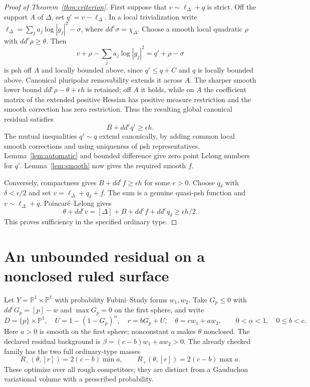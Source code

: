 \documentclass[11pt]{article}
\theoremstyle{remark}
\newcommand{\ddc}{dd^{\mathrm c}}
\newcommand{\PP}{\mathbb P}
\begin{document}
\begin{proof}[Proof of Theorem~\ref{thm:criterion}]
First suppose that $v\sim\ell_\Delta+q$ is strict. Off the support
$A$ of $\Delta$, set $q'=v-\ell_\Delta$. In a local trivialization write
$\ell_\Delta=\sum_j a_j\log|g_j|^2-\sigma$, where
$\ddc\sigma=\chi_\Delta$. Choose a smooth local quadratic $\rho$
with $\ddc\rho\geq\theta$. Then
\[
 v+\rho-\sum_j a_j\log|g_j|^2=q'+\rho-\sigma
\]
is psh off $A$ and locally bounded above, since $q'\leq q+C$ and
$q$ is locally bounded above. Canonical pluripolar removability
\cite[I.5.23--5.24]{DemaillyBook} extends it across $A$.
The sharper smooth lower bound
$\ddc\rho-\theta+\epsilon h$ is retained: off $A$ it holds, while
on $A$ the coefficient matrix of the extended positive Hessian has positive
measure restriction and the smooth correction has zero restriction.
Thus the resulting global canonical residual satisfies
\[
 B+\ddc q'\geq\epsilon h.
\]
The mutual inequalities $q'\sim q$ extend canonically, by adding common
local smooth corrections and using uniqueness of psh representatives.
Lemma~\ref{lem:automatic} and bounded difference give zero point Lelong
numbers for $q'$. Lemma~\ref{lem:smooth} now gives the required smooth $f$.

Conversely, compactness gives $B+\ddc f\geq\epsilon h$ for some
$\epsilon>0$. Choose $q_\delta$ with $\delta<\epsilon/2$ and set
$v=\ell_\Delta+q_\delta+f$. The sum is a genuine quasi-psh function
and $v\sim\ell_\Delta+q$. Poincar\'e--Lelong gives
\[
 \theta+\ddc v=[\Delta]+B+\ddc f+\ddc q_\delta
                \geq\epsilon h/2.
\]
This proves sufficiency in the specified ordinary type.
\end{proof}

\section{An unbounded residual on a nonclosed ruled surface}
Let $Y=\PP^1\times\PP^1$ with probability Fubini--Study forms $w_1,w_2$.
Take $G_p\leq0$ with $\ddc G_p=[p]-w$ and $\max G_p=0$ on the first
sphere, and write
\[
 D=\{p\}\times\PP^1,\quad U=1-(1-G_p)^\alpha,\quad
 r=bG_p+U,\quad \theta=cw_1+aw_2,
 \qquad 0<\alpha<1,\quad 0\leq b<c.
\]
Here $a>0$ is smooth on the first sphere; nonconstant $a$ makes $\theta$
nonclosed. The declared residual background is
$\beta=(c-b)w_1+aw_2>0$. The already checked family \cite{Ruled}
has the two full ordinary-type masses
\[
 R_-(\theta,[r])=2(c-b)\min a,
 \qquad R_+(\theta,[r])=2(c-b)\max a.
\]
These optimize over all rough competitors; they are distinct from a
Gauduchon variational volume with a prescribed probability.
\end{document}
